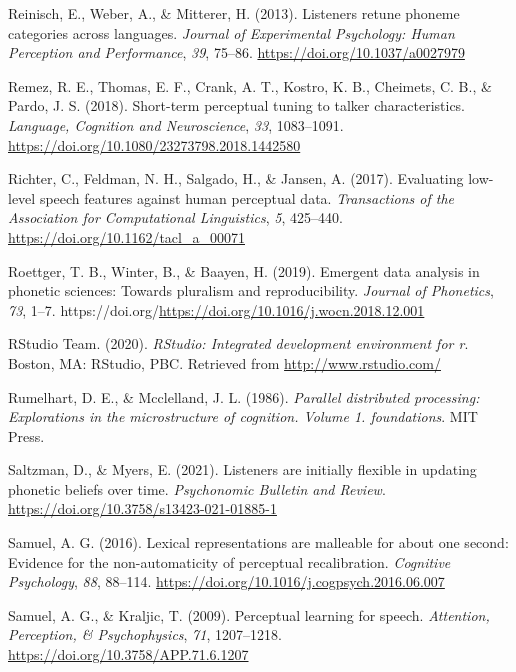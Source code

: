 \documentclass[
  11pt,
  english,
  man,floatsintext]{apa6}
\newlength{\cslhangindent}
\newlength{\cslentryspacingunit} %
\newenvironment{CSLReferences}[2] %
 {%
  \setlength{\parindent}{0pt}
  \ifodd #1
  \let\oldpar\par
  \def\par{\hangindent=\cslhangindent\oldpar}
  \fi
  \setlength{\parskip}{#2\cslentryspacingunit}
 }%
 {}
\begin{document}
\begin{CSLReferences}{1}{0}
\leavevmode{}%
Reinisch, E., Weber, A., \& Mitterer, H. (2013). Listeners retune phoneme categories across languages. \emph{Journal of Experimental Psychology: Human Perception and Performance}, \emph{39}, 75--86. \url{https://doi.org/10.1037/a0027979}

\leavevmode{}%
Remez, R. E., Thomas, E. F., Crank, A. T., Kostro, K. B., Cheimets, C. B., \& Pardo, J. S. (2018). Short-term perceptual tuning to talker characteristics. \emph{Language, Cognition and Neuroscience}, \emph{33}, 1083--1091. \url{https://doi.org/10.1080/23273798.2018.1442580}

\leavevmode{}%
Richter, C., Feldman, N. H., Salgado, H., \& Jansen, A. (2017). Evaluating low-level speech features against human perceptual data. \emph{Transactions of the Association for Computational Linguistics}, \emph{5}, 425--440. \url{https://doi.org/10.1162/tacl_a_00071}

\leavevmode{}%
Roettger, T. B., Winter, B., \& Baayen, H. (2019). Emergent data analysis in phonetic sciences: Towards pluralism and reproducibility. \emph{Journal of Phonetics}, \emph{73}, 1--7. https://doi.org/\url{https://doi.org/10.1016/j.wocn.2018.12.001}

\leavevmode{}%
RStudio Team. (2020). \emph{RStudio: Integrated development environment for r}. Boston, MA: RStudio, PBC. Retrieved from \url{http://www.rstudio.com/}

\leavevmode{}%
Rumelhart, D. E., \& Mcclelland, J. L. (1986). \emph{Parallel distributed processing: Explorations in the microstructure of cognition. Volume 1. foundations}. MIT Press.

\leavevmode{}%
Saltzman, D., \& Myers, E. (2021). Listeners are initially flexible in updating phonetic beliefs over time. \emph{Psychonomic Bulletin and Review}. \url{https://doi.org/10.3758/s13423-021-01885-1}

\leavevmode{}%
Samuel, A. G. (2016). Lexical representations are malleable for about one second: Evidence for the non-automaticity of perceptual recalibration. \emph{Cognitive Psychology}, \emph{88}, 88--114. \url{https://doi.org/10.1016/j.cogpsych.2016.06.007}

\leavevmode{}%
Samuel, A. G., \& Kraljic, T. (2009). Perceptual learning for speech. \emph{Attention, Perception, \& Psychophysics}, \emph{71}, 1207--1218. \url{https://doi.org/10.3758/APP.71.6.1207}


\end{CSLReferences}
\end{document}
